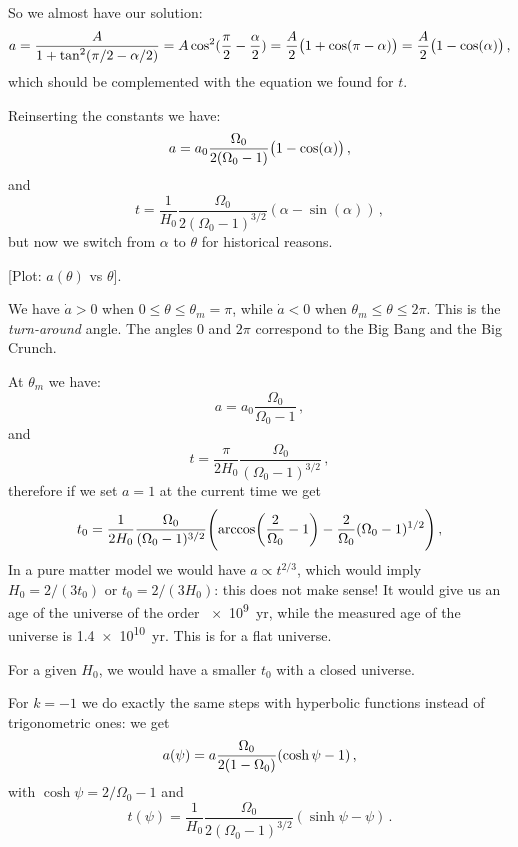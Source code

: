 \documentclass[main.tex]{subfiles}
\begin{document}
So we almost have our solution: 
%
\begin{equation}
  a = \frac{A}{1 + \tan^2(\pi /2 - \alpha /2)} = A \cos^2(\frac{\pi}{2} - \frac{\alpha}{2})  = \frac{A}{2} \qty(1+\cos(\pi - \alpha ) ) = \frac{A}{2} \qty(1- \cos(\alpha ) )
\,,
\end{equation}
which should be complemented with the equation we found for \(t\).

Reinserting the constants we have:
%
\begin{equation}
  a = a_0 \frac{\Omega_0}{2 (\Omega_0 -1)} \qty(1- \cos(\alpha ) ) 
\,,
\end{equation}
%
and
%
\begin{equation}
  t = \frac{1}{H_0 } \frac{\Omega_0}{2 (\Omega_0 -1)^{3/2}}(\alpha - \sin(\alpha ) )
\,,
\end{equation}
%
but now we switch from \(\alpha \) to \(\theta \) for historical reasons.

[Plot: \(a(\theta )\) vs \(\theta \)].

We have \(\dot{a} > 0 \)   when \(0 \leq \theta \leq \theta_m = \pi \), while \(\dot{a} < 0\) when \(\theta _m \leq \theta \leq 2 \pi \).
This is the \emph{turn-around} angle. The angles \(0\) and \(2 \pi \) correspond to the Big Bang and the Big Crunch.

At \(\theta _m\) we have: 
%
\begin{equation}
  a = a_0 \frac{\Omega_0}{\Omega_0 -1} 
\,,
\end{equation}
%
and 
%
\begin{equation}
  t = \frac{\pi}{2 H_0 } \frac{\Omega_0}{(\Omega_0 -1)^{3/2}}
\,,
\end{equation}
%
therefore if we set \(a=1\) at the current time we get 
%
\begin{equation}
  t_0 = \frac{1}{2H_0 } \frac{\Omega_0  }{(\Omega_0 -1)^{3/2}} \qty(\arccos (\frac{2}{\Omega_0 }-1) - \frac{2}{\Omega_0 } (\Omega_0 -1 )^{1/2})
\,,
\end{equation}
%
In a pure matter model we would have \(a \propto t^{2/3}\), which would imply \(H_0 = 2/(3 t_0 )\) or \(t_0 = 2 / (3 H_0 )\): this does not make sense! It would give us an age of the universe of the order \SI{e9}{yr}, while the measured age of the universe is \SI{1.4e10}{yr}.
This is for a flat universe.

For a given \(H_0 \), we would have a smaller \(t_0 \) with a closed universe.

For \(k = -1\) we do exactly the same steps with hyperbolic functions instead of trigonometric ones: we get 
%
\begin{equation}
  a ( \psi ) = a \frac{\Omega_0 }{2 (1-\Omega_0)} \qty(\cosh \psi -1)
\,,
\end{equation}
%
with \(\cosh\psi = 2/\Omega_0 -1\) and 
%
\begin{equation}
  t (\psi ) =  \frac{1}{H_0 } \frac{\Omega_0}{2 (\Omega_0 -1)^{3/2}}(\sinh \psi - \psi  )
\,.
\end{equation}
%
\end{document}
